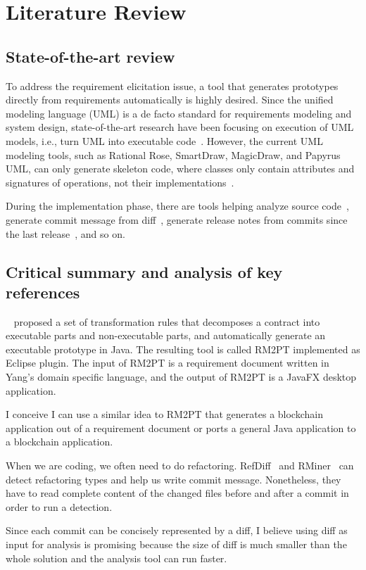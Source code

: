 \chapter{Literature Review}



\section{State-of-the-art review}

To address the requirement elicitation issue, a tool that generates prototypes directly from requirements automatically is highly desired.
Since the unified modeling language (UML) is a de facto standard for requirements modeling and system design,
state-of-the-art research have been focusing on execution of UML models, i.e., turn UML into executable code~\cite{ciccozzi2019execution}.
However, the current UML modeling tools, such as Rational Rose, SmartDraw, MagicDraw, and Papyrus UML, can only generate skeleton code, where classes only contain attributes and signatures of operations, not their implementations~\cite{regep2000using}.

During the implementation phase, there are tools helping analyze source code~\cite{morgachev2019detection,huo2016learning,gu2016deep},
generate commit message from diff~\cite{linares2015changescribe,buse2010automatically,huang2020learning},
generate release notes from commits since the last release~\cite{moreno2016arena}, and so on.



\section{Critical summary and analysis of key references}

~\cite{yang2019automated} proposed a set of transformation rules that decomposes a contract into executable parts and non-executable parts, and automatically generate an executable prototype in Java.
The resulting tool is called RM2PT implemented as Eclipse plugin. The input of RM2PT is a requirement document written in Yang's domain specific language, and the output of RM2PT is a JavaFX desktop application.

I conceive I can use a similar idea to RM2PT that generates a blockchain application out of a requirement document or ports a general Java application to a blockchain application.


When we are coding, we often need to do refactoring.
RefDiff~\cite{silva2020refdiff} and RMiner~\cite{tsantalis2018accurate} can detect refactoring types and help us write commit message. Nonetheless, they have to read complete content of the changed files before and after a commit in order to run a detection.

Since each commit can be concisely represented by a diff, I believe using diff as input for analysis is promising because the size of diff is much smaller than the whole solution and the analysis tool can run faster.